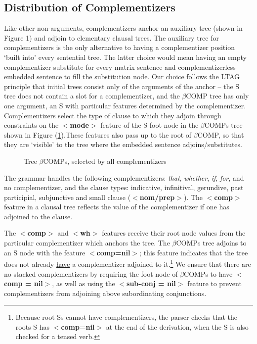 \subsection{Distribution of Complementizers}
Like other non-arguments, complementizers anchor an auxiliary tree
(shown in Figure 1) and adjoin to elementary clausal trees.  The
auxiliary tree for complementizers is the only alternative to having a
complementizer position `built into' every sentential tree.  The
latter choice would mean having an empty complementizer substitute for
every matrix sentence and complementizerless embedded sentence to fill
the substitution node.  Our choice follows the LTAG principle that
initial trees consist only of the arguments of the anchor -- the S
tree does not contain a slot for a complementizer, and the $\beta$COMP
tree has only one argument, an S with particular features determined by
the complementizer.  Complementizers select the type of clause to
which they adjoin through constraints on the {\bf $<$mode$>$} feature of the
S foot node in the $\beta$COMPs tree shown in Figure
(\ref{comp-tree}).These features also pass up to the root of
$\beta$COMP, so that they are `visible' to the tree where the embedded
sentence adjoins/substitutes.

\begin{figure}[h]
\centering
\hspace{0.0in}
\caption{Tree $\beta$COMPs, selected by all complementizers}
\label{comp-tree}
\end{figure}

The grammar handles the following complementizers: {\it that\/}, {\it
whether\/}, {\it if\/}, {\it for\/}, and no complementizer, and the
clause types: indicative, infinitival, gerundive, past participial,
subjunctive and small clause ({\bf $<$nom/prep$>$}).  The {\bf
$<$comp$>$} feature in a clausal tree reflects the value of the
complementizer if one has adjoined to the clause. 

The {\bf $<$comp$>$} and {\bf $<$wh$>$} features receive their root
node values from the particular complementizer which anchors the tree.
The $\beta$COMPs tree adjoins to an S node with the feature {\bf
$<$comp=nil$>$}; this feature indicates that the tree does not already
\underline{have} a complementizer adjoined to it.\footnote{ Because root Ss
cannot have complementizers, the parser checks that the roots S has
{\bf $<$comp=nil$>$} at the end of the derivation, when the S is also
checked for a tensed verb.} We ensure that there are no stacked
complementizers by requiring the foot node of $\beta$COMPs to have {\bf
$<$comp = nil$>$}, as well as using the {\bf $<$sub-conj = nil$>$} feature to
prevent complementizers from adjoining above subordinating conjunctions.

